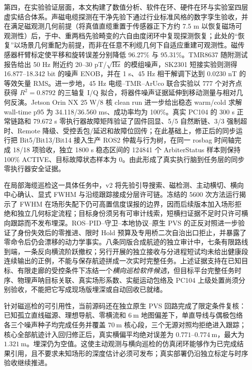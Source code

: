 第四，在实验验证层面，本文构建了数值分析、软件在环、硬件在环与实验室四层虚实结合体系。声磁电缆探测在干净先验下通过行业标准风格的数字孪生验收，并在满足磁观测几何前提（将真值直缆重置于传感器正下方约 7.5 m 以恢复磁场可观测性）后，于中、重两档先验畸变的六自由度闭环中复现探测恢复；此处的``恢复''以场景几何重配为前提，而非在任意不利缆几何下自适应重建可观测性。磁传感器杆臂标定使平移和旋转误差分别降低 96.27\% 与 95.31\%。TMR8637 随附测试报告给出 50 Hz 附近约 20--30 pT/\(\sqrt{\text{Hz}}\) 的模组噪声，SK2301 短接实验则测得 16.877--18.342 bit 的噪声 ENOB，并在 1 s、45 Hz 相干解调下达到 0.0230 nT 的等效矢量 RMS。进一步地，45 Hz 电缆--TMR--ArUco 联合实验以 777 个对齐点获得 \(R^2=0.8792\) 的三轴复 I/Q 拟合，将器件噪声证据延伸到移动测量与相对几何反演。Jetson Orin NX 25 W/8 核 clean run 进一步给出稳态 warm/cold 求解 wall-time p95 为 34.118/36.560 ms、成功率均为 100\%。真实 PC104 的 300 s 正常链路和 79.672 s 零执行器故障矩阵验证了固件回显、5/5 自然断链、3/3 强制超时、Remote 降级、受控丢包/延迟和故障位回传；在此基础上，修正后的同步运行把 Bit5/Bit13/Bit14 接入生产 ROS2 仲裁与行为树，在同一 rosbag 时间轴完成 18/18 项验收，独立 1800 s 稳态区间的 124841 个 ArbiterStatus 样本则保持 100\% ACTIVE、目标故障状态样本为 0。由此形成了真实执行脑到任务层的同步零执行器安全证据。

在局部海缆巡检这一具体任务中，v2 将先验引导搜索、磁检测、主动横切、横向中心确认、显式 FWHM 与沿缆跟踪接成分层许可链。冻结的 5600 次方法运行揭示了 FWHM 在场形失配下仍可高置信度误报的边界，因而后续版本加入场形拒绝和独立几何标定流程；目标身份须另有可审计线索，短横扫证据不足时只许可横向跟踪而不发布埋深。ROS--PID--守卫--本地协议--原生 PVS 的正反对照进一步验证了身份失效后的零推进、限时 Hold 预算及专用桥二次自治出口拒止，并暴露了零命令后仍会漂移的动力学事实。八条同版合成航迹的独立审计中，七条有限路线到端，一条反向横流阶跃撤权；另行开展的独立接收与分进程短试均未给出健康段连续输出的正例，不能与保存航迹拼成一次实时完整任务。上述证据支持在已知目标、有限走廊的受控条件下冻结一个\emph{横向巡检软件候选}，但目标平台完整任务时序、物理声呐目标关联、真实场形系数、实艇运动包络及 PC104 上级处置尚须分别验收，不能把它写成现场版埋深或自动回收已就绪。

针对磁巡检的可引用性，当前源码还在独立原生 PVS 回路完成了限定条件复核：已知孤立直线磁源、理想导航、零横流和 $6~\mathrm{m}$ 地图偏差下，单直导线与偶极包络各三个噪声种子均完成任务并覆盖 $70~\mathrm{m}$ 核心段，三个无源对照均拒绝进入跟踪；核心全部航迹计入回归修正后，真实横偏平均绝对误差为 $0.771$--$0.774~\mathrm{m}$，最大为 $1.321~\mathrm{m}$。埋深仍为空值。这使主动观测与横向巡检的仿真闭环能够作为已完成结果引用，且不要求未知场形的深度估计必须可发布；真实部署仍沿独立标定与时序验收继续推进。


